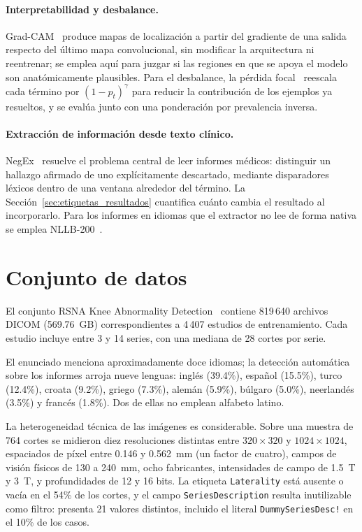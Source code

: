 \documentclass{article}
\begin{document}
\paragraph{Interpretabilidad y desbalance.}
Grad-CAM~\citep{selvaraju2017grad} produce mapas de localización a partir del
gradiente de una salida respecto del último mapa convolucional, sin modificar la
arquitectura ni reentrenar; se emplea aquí para juzgar si las regiones en que se
apoya el modelo son anatómicamente plausibles. Para el desbalance, la pérdida
focal~\citep{lin2017focal} reescala cada término por $(1-p_t)^\gamma$ para
reducir la contribución de los ejemplos ya resueltos, y se evalúa junto con una
ponderación por prevalencia inversa.

\paragraph{Extracción de información desde texto clínico.}
NegEx~\citep{chapman2001simple} resuelve el problema central de leer informes
médicos: distinguir un hallazgo afirmado de uno explícitamente descartado,
mediante disparadores léxicos dentro de una ventana alrededor del término. La
Sección~\ref{sec:etiquetas_resultados} cuantifica cuánto cambia el resultado al
incorporarlo. Para los informes en idiomas que el extractor no lee de forma
nativa se emplea NLLB-200~\citep{nllb2022}.

\section{Conjunto de datos}

El conjunto RSNA Knee Abnormality Detection~\citep{rsna2026knee} contiene
819\,640 archivos DICOM (569.76~GB) correspondientes a 4\,407 estudios de
entrenamiento. Cada estudio incluye entre 3 y 14 series, con una mediana de 28
cortes por serie.

El enunciado menciona aproximadamente doce idiomas; la detección automática sobre
los informes arroja nueve lenguas: inglés (39.4\%), español (15.5\%), turco
(12.4\%), croata (9.2\%), griego (7.3\%), alemán (5.9\%), búlgaro (5.0\%),
neerlandés (3.5\%) y francés (1.8\%). Dos de ellas no emplean alfabeto latino.

La heterogeneidad técnica de las imágenes es considerable. Sobre una muestra de
764 cortes se midieron diez resoluciones distintas entre $320\times320$ y
$1024\times1024$, espaciados de píxel entre 0.146 y 0.562~mm (un factor de
cuatro), campos de visión físicos de 130 a 240~mm, ocho fabricantes,
intensidades de campo de 1.5~T y 3~T, y profundidades de 12 y 16 bits. La
etiqueta \texttt{Laterality} está ausente o vacía en el 54\% de los cortes, y el
campo \texttt{SeriesDescription} resulta inutilizable como filtro: presenta 21
valores distintos, incluido el literal \texttt{DummySeriesDesc!} en el 10\% de los
casos.
\end{document}

